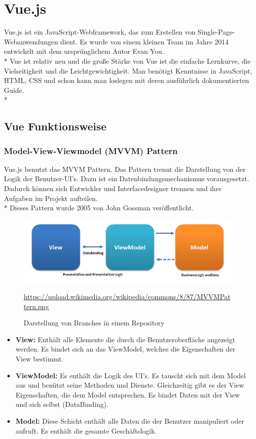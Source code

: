 \section{Vue.js}
\author{Benjamin Besic}
Vue.js ist ein JavaScript-Webframework, das zum Erstellen von Single-Page-Webanwendungen dient. 
Es wurde von einem kleinen Team im Jahre 2014 entwickelt mit dem ursprünglichem Autor Evan You.\\* Vue ist relativ neu und die große Stärke
von Vue ist die einfache Lernkurve, die Vielseitigkeit und die Leichtgewichtigkeit. Man benötigt Kenntnisse in JavaScript, HTML, CSS und schon kann man loslegen
mit deren ausführlich dokumentierten Guide\cite{VueGuide}. \cite{VueWissen} \cite{VueWiki}\\*

\subsection{Vue Funktionsweise}

\subsubsection{Model-View-Viewmodel (MVVM) Pattern }
Vue.js benutzt das MVVM Pattern. Das Pattern trennt die Darstellung von der Logik der Benutzer-UI's.
Dazu ist ein Datenbindungsmechanismus vorausgesetzt. Dadurch können sich Entwickler und Interfacedesigner trennen und ihre Aufgaben im Projekt 
aufteilen. \\*
Dieses Pattern wurde 2005 von John Gossman veröffentlicht. \cite{MVVM}

\begin{figure}[htp]
    \centering
    \includegraphics[scale=0.7]{pics/MVVMPattern.png}
    \caption{Darstellung von Branches in einem Repository}
        \small \url{https://upload.wikimedia.org/wikipedia/commons/8/87/MVVMPattern.png}
    \label{fig:impl:MVVM}
\end{figure}

\begin{itemize}
    \item \textbf{View:} Enthält alle Elemente die durch die Benutzeroberfläche angezeigt werden. Es bindet sich an das ViewModel, welches die Eigenschaften der View bestimmt.
    \item \textbf{ViewModel:} Es enthält die Logik des UI's. Es tauscht sich mit dem Model aus und benützt seine Methoden und Dienste. Gleichzeitig
          gibt es der View Eigenschaften, die dem Model entsprechen. Es bindet Daten mit der View und sich selbst (DataBinding).
    \item \textbf{Model:} Diese Schicht enthält alle Daten die der Benutzer manipuliert oder aufruft. Es enthält die gesamte Geschäftslogik.\cite{MVVM}
\end{itemize}

